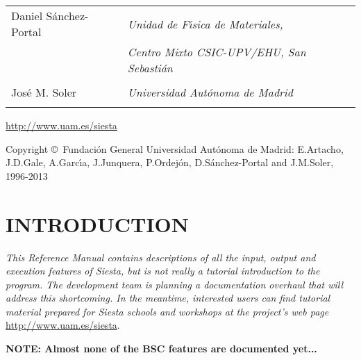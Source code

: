 \documentclass[11pt]{article}
\begin{document}
\begin{titlepage}
\begin{center}
{\begin{tabular}{ll}
{\Large Daniel S\'anchez-Portal} &
   \Large{\it Unidad de F\'{\i}sica de Materiales,} \\
                                 &
   \Large{\it Centro Mixto CSIC-UPV/EHU, San Sebasti\'an} \\ \\

{\Large Jos\'e M. Soler} &
   \Large{\it Universidad Aut\'onoma de Madrid} \\ \\

\end{tabular}
}

\vspace{0.5cm}
{\Large \url{http://www.uam.es/siesta}}

\vspace{0.5cm}
Copyright \copyright\  Fundaci\'on General Universidad Aut\'onoma de Madrid:
E.Artacho, J.D.Gale, A.Garc\'{\i}a, J.Junquera, P.Ordej\'on,
D.S\'anchez-Portal and J.M.Soler, 1996-2013

\end{center}

\end{titlepage}


\newpage

\tableofcontents

\newpage

\section{INTRODUCTION}

{\it This Reference Manual contains descriptions of all the input,
  output and execution features of {\sc Siesta}, but is not really a
  tutorial introduction to the program. The development team is
  planning a documentation overhaul that will address this
  shortcoming. In the meantime, interested users can find tutorial
  material prepared for {\sc Siesta} schools and workshops at the
  project's web page} \url{http://www.uam.es/siesta}.


{\bf NOTE: Almost none of the BSC features are documented yet...}
\end{document}

